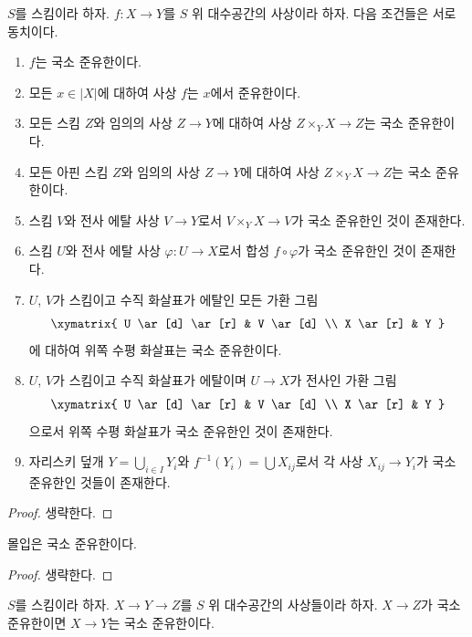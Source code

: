 \begin{lemma}
\label{lemma-quasi-finite-local}
$S$를 스킴이라 하자.
$f : X \to Y$를 $S$ 위 대수공간의 사상이라 하자.
다음 조건들은 서로 동치이다.
\begin{enumerate}
\item $f$는 국소 준유한이다.
\item 모든 $x \in |X|$에 대하여 사상 $f$는 $x$에서 준유한이다.
\item 모든 스킴 $Z$와 임의의 사상 $Z \to Y$에 대하여 사상
$Z \times_Y X \to Z$는 국소 준유한이다.
\item 모든 아핀 스킴 $Z$와 임의의 사상 $Z \to Y$에 대하여 사상
$Z \times_Y X \to Z$는 국소 준유한이다.
\item 스킴 $V$와 전사 에탈 사상 $V \to Y$로서
$V \times_Y X \to V$가 국소 준유한인 것이 존재한다.
\item 스킴 $U$와 전사 에탈 사상 $\varphi : U \to X$로서
합성 $f \circ \varphi$가 국소 준유한인 것이 존재한다.
\item $U$, $V$가 스킴이고 수직 화살표가 에탈인 모든 가환 그림
$$
\xymatrix{
U \ar[d] \ar[r] & V \ar[d] \\
X \ar[r] & Y
}
$$
에 대하여 위쪽 수평 화살표는 국소 준유한이다.
\item $U$, $V$가 스킴이고 수직 화살표가 에탈이며
$U \to X$가 전사인 가환 그림
$$
\xymatrix{
U \ar[d] \ar[r] & V \ar[d] \\
X \ar[r] & Y
}
$$
으로서 위쪽 수평 화살표가 국소 준유한인 것이 존재한다.
\item 자리스키 덮개 $Y = \bigcup_{i \in I} Y_i$와
$f^{-1}(Y_i) = \bigcup X_{ij}$로서 각 사상
$X_{ij} \to Y_i$가 국소 준유한인 것들이 존재한다.
\end{enumerate}
\end{lemma}

\begin{proof}
생략한다.
\end{proof}

\begin{lemma}
\label{lemma-immersion-quasi-finite}
몰입은 국소 준유한이다.
\end{lemma}

\begin{proof}
생략한다.
\end{proof}

\begin{lemma}
\label{lemma-permanence-quasi-finite}
$S$를 스킴이라 하자.
$X \to Y \to Z$를 $S$ 위 대수공간의 사상들이라 하자.
$X \to Z$가 국소 준유한이면 $X \to Y$는 국소 준유한이다.
\end{lemma}

